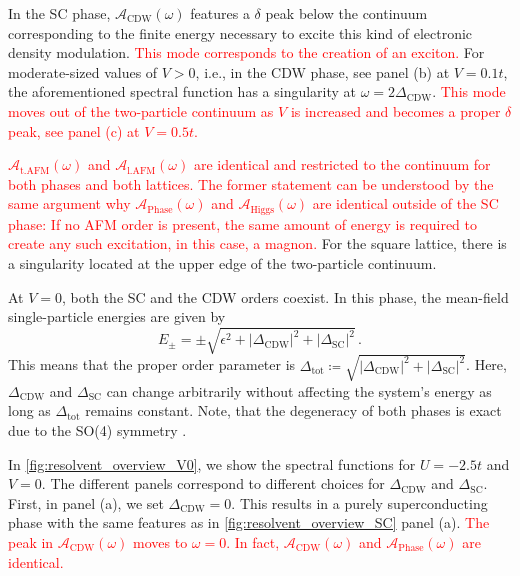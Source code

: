 \documentclass[
    reprint, 
    aps,
    preprintnumbers,
    twocolumn,
    prb,
    superscriptaddress
]{revtex4-2}
\newcommand{\spectral}[1]{\mathcal{A}_\text{#1}  (\omega)}
\begin{document}
In the SC phase, $\spectral{CDW}$ features a $\delta$ peak below the continuum corresponding to the finite energy necessary to excite this kind of electronic density modulation.
\textcolor{red}{This mode corresponds to the creation of an exciton.}
For moderate-sized values of $V>0$, i.e., in the CDW phase, see panel (b) at $V=0.1t$, the aforementioned spectral function has a singularity at $\omega=2\Delta_\text{CDW}$.%
\textcolor{red}{This mode moves out of the two-particle continuum as $V$ is increased and becomes a proper $\delta$ peak, see panel (c) at $V=0.5t$.}

\textcolor{red}{$\spectral{t.AFM}$ and $\spectral{l.AFM}$ are identical and restricted to the continuum for both phases and both lattices.
The former statement can be understood by the same argument why $\spectral{Phase}$ and $\spectral{Higgs}$ are identical outside of the SC phase:
If no AFM order is present, the same amount of energy is required to create any such excitation, in this case, a magnon.}
For the square lattice, there is a singularity located at the upper edge of the two-particle continuum.


At $V=0$, both the SC and the CDW orders coexist. 
In this phase, the mean-field single-particle energies are given by
\begin{equation}
    E_{\pm} = \pm \sqrt{\epsilon^2 + |\Delta_\text{CDW}|^2 + |\Delta_\text{SC}|^2}\,.
\end{equation}
This means that the proper order parameter is $\Delta_\text{tot} \coloneqq \sqrt{|\Delta_\text{CDW}|^2 + |\Delta_\text{SC}|^2}$.
Here, $\Delta_\text{CDW}$ and $\Delta_\text{SC}$ can change arbitrarily without affecting the system's energy as long as $\Delta_\text{tot}$ remains constant.
Note, that the degeneracy of both phases is exact due to the SO(4) symmetry \cite{yang90}. 

In \autoref{fig:resolvent_overview_V0}, we show the spectral functions for $U=-2.5t$ and $V=0$.
The different panels correspond to different choices for $\Delta_\text{CDW}$ and $\Delta_\text{SC}$.
First, in panel (a), we set $\Delta_\text{CDW} = 0$.
This results in a purely superconducting phase with the same features as in \autoref{fig:resolvent_overview_SC} panel (a).
\textcolor{red}{The peak in $\spectral{CDW}$ moves to $\omega=0$. In fact, $\spectral{CDW}$ and $\spectral{Phase}$ are identical.}
\end{document}
